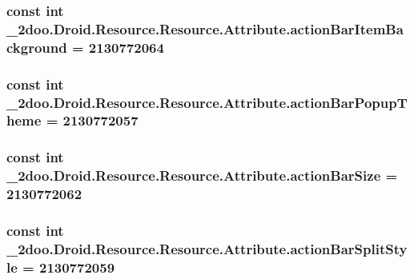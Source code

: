 \hypertarget{class__2doo_1_1_droid_1_1_resource_1_1_attribute_3daad9ebff0b1dcb5a9f890d799d451e}{
\subsubsection[{actionBarItemBackground}]{\setlength{\rightskip}{0pt plus 5cm}const int \_\-2doo.Droid.Resource.Resource.Attribute.actionBarItemBackground = 2130772064}}
\label{class__2doo_1_1_droid_1_1_resource_1_1_attribute_3daad9ebff0b1dcb5a9f890d799d451e}


\hypertarget{class__2doo_1_1_droid_1_1_resource_1_1_attribute_d85cfd5b41f1289c29c3518c259e7e9f}{
\subsubsection[{actionBarPopupTheme}]{\setlength{\rightskip}{0pt plus 5cm}const int \_\-2doo.Droid.Resource.Resource.Attribute.actionBarPopupTheme = 2130772057}}
\label{class__2doo_1_1_droid_1_1_resource_1_1_attribute_d85cfd5b41f1289c29c3518c259e7e9f}


\hypertarget{class__2doo_1_1_droid_1_1_resource_1_1_attribute_97e96486337d0366a064ae7a32843a25}{
\subsubsection[{actionBarSize}]{\setlength{\rightskip}{0pt plus 5cm}const int \_\-2doo.Droid.Resource.Resource.Attribute.actionBarSize = 2130772062}}
\label{class__2doo_1_1_droid_1_1_resource_1_1_attribute_97e96486337d0366a064ae7a32843a25}


\hypertarget{class__2doo_1_1_droid_1_1_resource_1_1_attribute_df230fc290f081e05a70c7d32bf0efe4}{
\subsubsection[{actionBarSplitStyle}]{\setlength{\rightskip}{0pt plus 5cm}const int \_\-2doo.Droid.Resource.Resource.Attribute.actionBarSplitStyle = 2130772059}}
\label{class__2doo_1_1_droid_1_1_resource_1_1_attribute_df230fc290f081e05a70c7d32bf0efe4}


